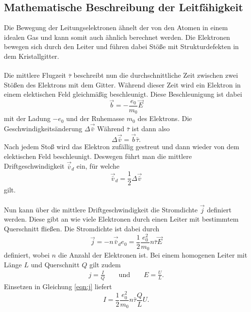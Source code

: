 \subsection{Mathematische Beschreibung der Leitfähigkeit}
Die Bewegung der Leitungselektronen ähnelt der von den Atomen in einem idealen Gas und kann somit auch ähnlich
berechnet werden. Die Elektronen bewegen sich durch den Leiter und führen dabei Stöße mit Strukturdefekten in 
dem Kristallgitter.\\\\
Die mittlere Flugzeit $\bar{\tau}$ beschreibt nun die durchschnittliche Zeit zwischen zwei Stößen des Elektrons mit
dem Gitter. Während dieser Zeit wird ein Elektron in einem elektischen Feld gleichmäßig beschleunigt. Diese
Beschleunigung ist dabei
\begin{equation*}
    \vec{b}=-\frac{e_0}{m_0}\vec{E}
\end{equation*}
mit der Ladung $-e_0$ und der Ruhemasse $m_0$ des Elektrons. Die Geschwindigkeitsänderung $\Delta\vec{\bar{v}}$
Während $\bar{\tau}$ ist dann also
\begin{equation*}
    \Delta\vec{\bar{v}}=\vec{b}\bar{\tau}.
\end{equation*}
Nach jedem Stoß wird das Elektron zufällig gestreut und dann wieder von dem elektischen Feld
beschleunigt. Deswegen führt man die mittlere Driftgeschwindigkeit $\vec{\bar{v}}_d$ ein, für welche 
\begin{equation*}
    \vec{\bar{v}}_d=\frac{1}{2}\Delta\vec{\bar{v}}
\end{equation*}
gilt. \\\\
Nun kann über die mittlere Driftgeschwindigkeit die Stromdichte $\vec{j}$ definiert werden. Diese gibt an
wie viele Elektronen durch einen Leiter mit bestimmtem Querschnitt fließen. Die Stromdichte ist dabei durch
\begin{equation}
    \vec{j}=-n \vec{\bar{v}}_d e_0
    =\frac{1}{2}\frac{e_0^2}{m_0}n\bar{\tau}\vec{E} \label{eqn:j}
\end{equation}
definiert, wobei $n$ die Anzahl der Elektronen ist. Bei einem homogenen Leiter mit Länge $L$ und Querschnitt
$Q$ gilt zudem
\begin{align*}
    j=\frac{I}{Q} \qquad \text{und} \qquad E=\frac{U}{L}.
\end{align*}
Einsetzen in Gleichung \eqref{eqn:j} liefert
\begin{equation}
    I=\frac{1}{2}\frac{e_0^2}{m_0}n\bar{\tau}\frac{Q}{L}U. \label{eqn:I}
\end{equation}
